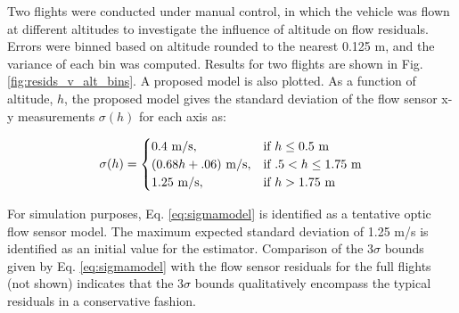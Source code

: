 \documentclass{article}
\begin{document}
Two flights were conducted under manual control, in which the vehicle was flown at different altitudes to investigate the influence of altitude on flow residuals. Errors were binned based on altitude rounded to the nearest 0.125 m, and the variance of each bin was computed. Results for two flights are shown in Fig. \ref{fig:resids_v_alt_bins}. A proposed model is also plotted. As a function of altitude, $h$, the proposed model gives the standard deviation of the flow sensor x-y measurements $\sigma(h)$ for each axis as:

\begin{equation}
\sigma(h) = \begin{cases}
0.4 \ \mathrm{m/s}, & \text{if $h \leq 0.5 $ m} \\
(0.68h + .06) \ \mathrm{m/s}, & \text{if $ .5 < h \leq 1.75 $ m} \\
1.25 \ \mathrm{m/s}, & \text{if $h > 1.75 $ m}
\end{cases}
\label{eq:sigmamodel}
\end{equation}

For simulation purposes, Eq. \ref{eq:sigmamodel} is identified as a tentative optic flow sensor model. The maximum expected standard deviation of 1.25 m/s is identified as an initial value for the estimator. Comparison of the 3$\sigma$ bounds given by Eq. \ref{eq:sigmamodel} with the flow sensor residuals for the full flights (not shown) indicates that the 3$\sigma$ bounds qualitatively encompass the typical residuals in a conservative fashion.
\end{document}
